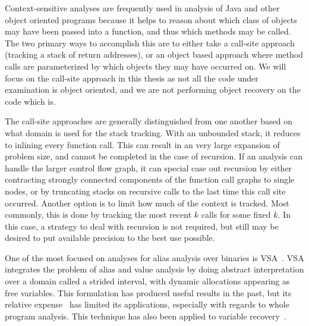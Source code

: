 Context-sensitive analyses are frequently used in analysis of Java and other object oriented programs because it helps to reason about which class of objects may have been passed into a function, and thus which methods may be called.
The two primary ways to accomplish this are to either take a call-site approach (tracking a stack of return addresses), or an object based approach where method calls are parameterized by which objects they may have occurred on.
We will focus on the call-site approach in this thesis as not all the code under examination is object oriented, and we are not performing object recovery on the code which is.

The call-site approaches are generally distinguished from one another based on what domain is used for the stack tracking.
With an unbounded stack, it reduces to inlining every function call.
This can result in an very large expansion of problem size, and cannot be completed in the case of recursion.
If an analysis can handle the larger control flow graph, it can special case out recursion by either contracting strongly connected components of the function call graphs to single nodes, or by truncating stacks on recursive calls to the last time this call site occurred.
Another option is to limit how much of the context is tracked.
Most commonly, this is done by tracking the most recent $k$ calls for some fixed $k$.
In this case, a strategy to deal with recursion is not required, but still may be desired to put available precision to the best use possible.

One of the most focused on analyses for alias analysis over binaries is VSA~\cite{vsa}.
VSA integrates the problem of alias and value analysis by doing abstract interpretation over a domain called a strided interval, with dynamic allocations appearing as free variables.
This formulation has produced useful results in the past, but its relative expense~\cite{angr-sok} has limited its applications, especially with regards to whole program analysis.
This technique has also been applied to variable recovery~\cite{divine}.
